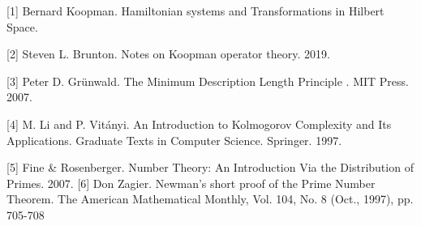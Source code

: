 \documentclass{article}
\begin{document}
\small

[1] Bernard Koopman. Hamiltonian systems and Transformations in Hilbert Space.

[2] Steven L. Brunton. Notes on Koopman operator theory. 2019.

[3] Peter D. Grünwald. The Minimum Description Length Principle
. MIT Press. 2007.

[4] M. Li and P. Vitányi. An Introduction to Kolmogorov Complexity and Its Applications. Graduate Texts in Computer Science. Springer. 1997.

[5] Fine & Rosenberger. Number Theory: An Introduction Via the Distribution of Primes. 2007.
[6] Don Zagier. Newman’s short proof of the Prime Number Theorem. The American Mathematical Monthly, Vol. 104, No. 8 (Oct., 1997), pp. 705-708
\end{document}
